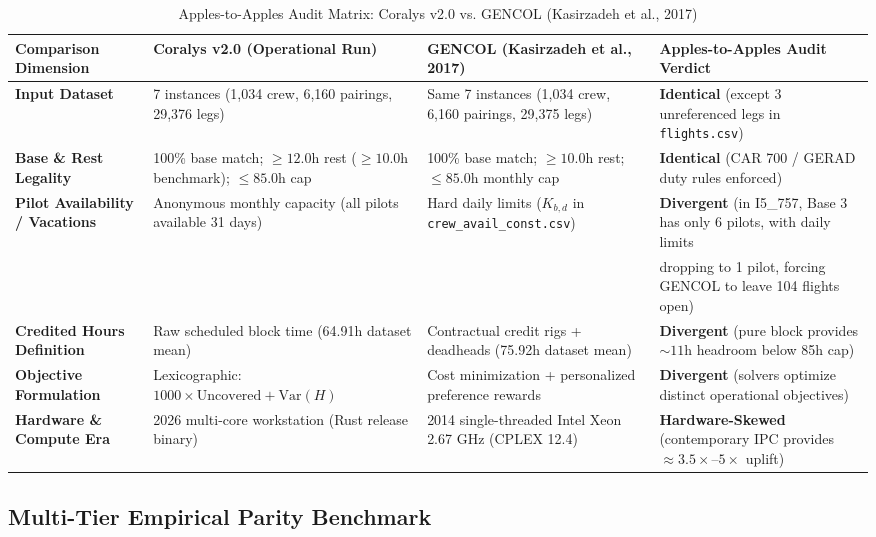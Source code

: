 \documentclass[journal]{IEEEtran}
\begin{document}
\begin{table}[t]
\caption{Apples-to-Apples Audit Matrix: Coralys v2.0 vs. GENCOL (Kasirzadeh et al., 2017)}
\label{tab:audit_matrix}
\centering
\begin{tabular}{llll}
\toprule
Comparison Dimension & Coralys v2.0 (Operational Run) & GENCOL (Kasirzadeh et al., 2017) & Apples-to-Apples Audit Verdict \\
\midrule
\textbf{Input Dataset} & 7 instances (1,034 crew, 6,160 pairings, 29,376 legs) & Same 7 instances (1,034 crew, 6,160 pairings, 29,375 legs) & \textbf{Identical} (except 3 unreferenced legs in \texttt{flights.csv}) \\
\textbf{Base \& Rest Legality} & 100\% base match; $\ge 12.0$h rest ($\ge 10.0$h benchmark); $\le 85.0$h cap & 100\% base match; $\ge 10.0$h rest; $\le 85.0$h monthly cap & \textbf{Identical} (CAR 700 / GERAD duty rules enforced) \\
\textbf{Pilot Availability / Vacations} & Anonymous monthly capacity (all pilots available 31 days) & Hard daily limits ($K_{b, d}$ in \texttt{crew\_avail\_const.csv}) & \textbf{Divergent} (in I5\_757, Base 3 has only 6 pilots, with daily limits \\
& & & dropping to 1 pilot, forcing GENCOL to leave 104 flights open) \\
\textbf{Credited Hours Definition} & Raw scheduled block time (64.91h dataset mean) & Contractual credit rigs + deadheads (75.92h dataset mean) & \textbf{Divergent} (pure block provides $\sim 11$h headroom below 85h cap) \\
\textbf{Objective Formulation} & Lexicographic: $1000 \times \text{Uncovered} + \text{Var}(H)$ & Cost minimization + personalized preference rewards & \textbf{Divergent} (solvers optimize distinct operational objectives) \\
\textbf{Hardware \& Compute Era} & 2026 multi-core workstation (Rust release binary) & 2014 single-threaded Intel Xeon 2.67 GHz (CPLEX 12.4) & \textbf{Hardware-Skewed} (contemporary IPC provides $\approx 3.5\times$--$5\times$ uplift) \\
\bottomrule
\end{tabular}
\end{table}

\subsection{Multi-Tier Empirical Parity Benchmark}
\end{document}
